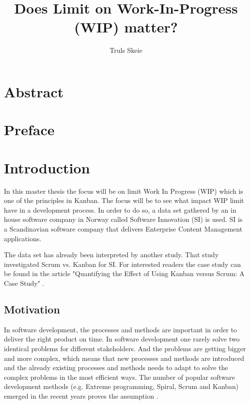 \documentclass[UKenglish]{ifimaster}  %
\title{Does Limit on Work-In-Progress (WIP) matter?}        %
\author{Truls Skeie}                      %
\begin{document}
\ififorside{}
\frontmatter{}
\maketitle{}

\chapter*{Abstract}                   %

\tableofcontents{}
\listoffigures{}
\listoftables{}
\lstlistoflistings{}

\chapter*{Preface}                    %

\mainmatter{}
\chapter{Introduction}
\label{chap:intro}
In this master thesis the focus will be on limit Work In Progress (WIP) which is one of the principles in Kanban. The focus will be to see what impact WIP limit have in a development process. In order to do so, a data set gathered by an in house software company in Norway called Software Innovation (SI) is used. SI is a Scandinavian software company that delivers Enterprise Content Management applications. 

The data set has already been interpreted by another study. That study investigated Scrum vs. Kanban for SI. For interested readers the case study can be found in the article "Quantifying the Effect of Using Kanban versus Scrum: A Case Study" \parencite{Dag}. 

\section{Motivation}
In software development, the processes and methods are important in order to deliver the right product on time. In software development one rarely solve two identical problems for different stakeholders. And the problems are getting bigger and more complex, which means that new processes and methods are introduced and the already existing processes and methods needs to adapt to solve the complex problems in the most efficient ways.  The number of popular software development methods  (e.g. Extreme programming, Spiral, Scrum and Kanban) emerged in the recent years proves the assumption \parencite{gandomani2013important} \parencite{ikonen2010exploring}.
\end{document}
